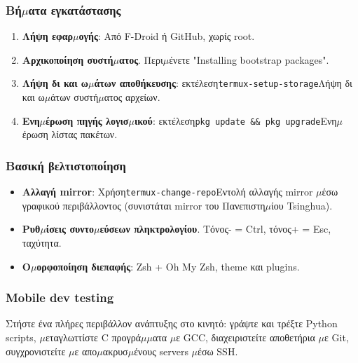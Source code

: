 
\subsubsection*{Βή$\mu$ατα εγκατάστασης}

\begin{enumerate}
  \item \textbf{Λήψη εφαρ$\mu$ογής}: Από F-Droid ή GitHub, χωρίς root.
  \item \textbf{Αρχικοποίηση συστή$\mu$ατος}. Περι$\mu$ένετε "Installing bootstrap packages".
  \item \textbf{Λήψη δι και ω$\mu$άτων αποθήκευσης}: εκτέλεση\texttt{termux-\allowbreak setup-\allowbreak storage}Λήψη δι και ω$\mu$άτων συστή$\mu$ατος αρχείων.
  \item \textbf{Ενη$\mu$έρωση πηγής λογισ$\mu$ικού}: εκτέλεση\texttt{pkg update \&\& pkg upgrade}Ενη$\mu$έρωση λίστας πακέτων.
\end{enumerate}

\subsubsection*{Βασική βελτιστοποίηση}

\begin{itemize}
  \item \textbf{Αλλαγή mirror}: Χρήση\texttt{termux-\allowbreak change-\allowbreak repo}Εντολή αλλαγής mirror $\mu$έσω γραφικού περιβάλλοντος (συνιστάται mirror του Πανεπιστη$\mu$ίου Tsinghua).
  \item \textbf{Ρυθ$\mu$ίσεις συντο$\mu$εύσεων πληκτρολογίου}. Τόνος- = Ctrl, τόνος+ = Esc, ταχύτητα.
  \item \textbf{Ο$\mu$ορφοποίηση διεπαφής}: Zsh + Oh My Zsh, theme και plugins.
\end{itemize}


\subsubsection*{Mobile dev testing}

Στήστε ένα πλήρες περιβάλλον ανάπτυξης στο κινητό: γράψτε και τρέξτε Python scripts, $\mu$εταγλωττίστε C προγρά$\mu$$\mu$ατα $\mu$ε GCC, διαχειριστείτε αποθετήρια $\mu$ε Git, συγχρονιστείτε $\mu$ε απο$\mu$ακρυσ$\mu$ένους servers $\mu$έσω SSH.

